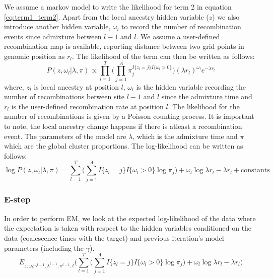 We assume a markov model to write the likelihood for term 2 in equation \ref{eq:term1_term2}. Apart from the local ancestry hidden variable ($z$) we also introduce another hidden variable, $\omega_l$ to record the number of recombination events since admixture between $l-1$ and $l$. We assume a user-defined recombination map is available, reporting distance between two grid points in genomic position as $r_l$. The likelihood of the term can then be written as follows:
\begin{equation}
    P(z, \omega_l \vert \lambda, \pi) \propto \prod\limits_{l=1}^{T} \Big( \prod\limits_{j=1}^{A} \pi_j ^ {I\{z_l = j\} I\{\omega_l > 0\}} \Big) (\lambda r_l)^{\omega_l} e^{-\lambda r_l}
\end{equation}
where, $z_l$ is local ancestry at position $l$, $\omega_l$ is the hidden variable recording the number of recombinations between site $l-1$ and $l$ since the admixture time and $r_l$ is the user-defined recombination rate at position $l$. The likelihood for the number of recombinations is given by a Poisson counting process. It is important to note, the local ancestry change happens if there is atleast a recombination event. The parameters of the model are $\lambda$, which is the admixture time and $\pi$ which are the global cluster proportions. The log-likelihood can be written as follows:
\begin{equation}
    \log P(z, \omega_l \vert \lambda, \pi) = \sum\limits_{l=1}^{T} \Big( \sum\limits_{j=1}^{A} I\{z_l = j\} I\{\omega_l > 0\} \log \pi_j \Big) + \omega_l \log \lambda r_l - \lambda r_l + \text{constants}
\end{equation}

\subsubsection{E-step}
\label{sec:term2_estep}

In order to perform EM, we look at the expected log-likelihood of the data where the expectation is taken with respect to the hidden variables conditioned on the data (coalescence times with the target) and previous iteration's model parameters (including the $\gamma$).
\begin{equation}
    E_{z, \omega_l \vert \gamma^{t-1}, \lambda^{t-1}, \pi^{t-1}, t}\Big( \sum\limits_{l=1}^{T} \Big( \sum\limits_{j=1}^{A} I\{z_l = j\} I\{\omega_l > 0\} \log \pi_j \Big) + \omega_l \log \lambda r_l - \lambda r_l \Big)
\end{equation}

